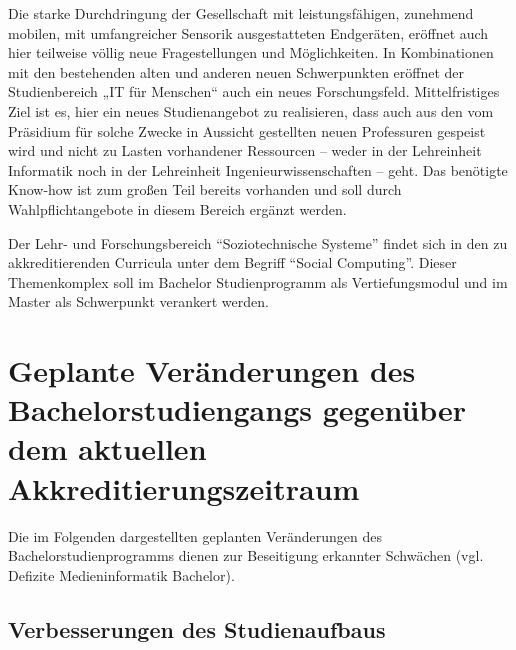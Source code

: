 \begin{siderules}
Die starke Durchdringung der Gesellschaft mit leistungsfähigen,
zunehmend mobilen, mit umfangreicher Sensorik ausgestatteten Endgeräten,
eröffnet auch hier teilweise völlig neue Fragestellungen und
Möglichkeiten. In Kombinationen mit den bestehenden alten und anderen
neuen Schwerpunkten eröffnet der Studienbereich „IT für Menschen`` auch
ein neues Forschungsfeld. Mittelfristiges Ziel ist es, hier ein neues
Studienangebot zu realisieren, dass auch aus den vom Präsidium für
solche Zwecke in Aussicht gestellten neuen Professuren gespeist wird und
nicht zu Lasten vorhandener Ressourcen -- weder in der Lehreinheit
Informatik noch in der Lehreinheit Ingenieurwissenschaften -- geht. Das
benötigte Know-how ist zum großen Teil bereits vorhanden und soll durch
Wahlpflichtangebote in diesem Bereich ergänzt werden.
\end{siderules}

Der Lehr- und Forschungsbereich ``Soziotechnische Systeme'' findet sich
in den zu akkreditierenden Curricula unter dem Begriff ``Social
Computing''. Dieser Themenkomplex soll im Bachelor Studienprogramm als
Vertiefungsmodul und im Master als Schwerpunkt verankert werden.

\section{Geplante Veränderungen des Bachelorstudiengangs gegenüber
dem aktuellen
Akkreditierungszeitraum}\label{geplante-veruxe4nderungen-des-bachelorstudiengangs-gegenuxfcber-dem-aktuellen-akkreditierungszeitraum}

Die im Folgenden dargestellten geplanten Veränderungen des
Bachelorstudienprogramms dienen zur Beseitigung erkannter Schwächen
(vgl. Defizite Medieninformatik Bachelor).

\subsection{Verbesserungen des
Studienaufbaus}\label{verbesserungen-des-studienaufbaus}

